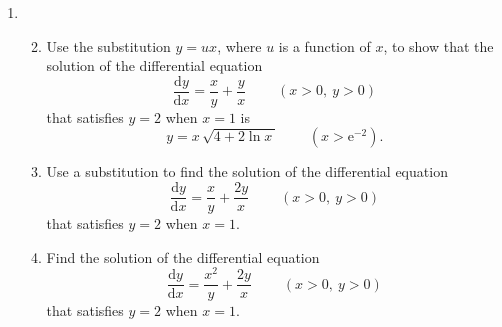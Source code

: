 \documentclass[a4, 11pt]{report}
\newlength{\qspace}
\newcounter{qnumber}
\newenvironment{question}%
 {\vspace{\qspace}
  \begin{enumerate}[\bfseries 1\quad][10]%
    \setcounter{enumi}{\value{qnumber}}%
    \item%
 }
{
  \end{enumerate}
  \filbreak
  \stepcounter{qnumber}
 }
\newenvironment{questionparts}[1][1]%
 {
  \begin{enumerate}[\bfseries (i)]%
    \setcounter{enumii}{#1}
    \addtocounter{enumii}{-1}
    \setlength{\itemsep}{5mm}
    \setlength{\parskip}{8pt}
 }
 {
  \end{enumerate}
 }
\def\d{{\mathrm d}}
\def\e{{\mathrm e}}
\begin{document}
\begin{question}
\begin{questionparts}
\item
Use the substitution $y=ux$, where $u$ is a function of $x$,
to show that the solution of the differential equation
\[
\frac{\d y}{\d x} = \frac x y + \frac y x
\ \ \ \ \ \ \ \ \ \ (x>  0, \ y>  0)
\] that satisfies $y=2$ when $x=1$
is 
\[
y= x\,  \sqrt{4+2\ln  x  \, }
\ \ \ \ \ \ \ \ \ \ ( x > \e^{-2}).
\]
\item Use a substitution to find the solution of the differential equation
\[
\frac{\d y}{\d x} = \frac x y + \frac {2y} x
\ \ \ \ \ \ \ \ \ \ (x>  0, \ y>  0)
\] that satisfies $y=2$ when $x=1$.
\item
Find the solution of the differential equation
\[
\frac{\d y}{\d x} = \frac {x^2} y + \frac {2y} x
\ \ \ \ \ \ \ \ \ \ (x>  0, \ y>  0)
\] that satisfies $y=2$ when $x=1$.
\end{questionparts}
\end{question}
		
\end{document}
